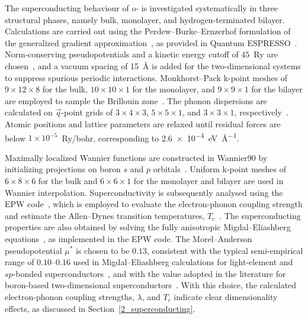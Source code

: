 The superconducting behaviour of o- is investigated systematically in three structural phases,
namely bulk, monolayer, and hydrogen-terminated bilayer.
Calculations are carried out using the Perdew--Burke--Ernzerhof formulation of the generalized gradient approximation~\cite{perdew1996generalized},
as provided in Quantum ESPRESSO~\cite{giannozzi2009quantum}.
Norm-conserving pseudopotentials and a kinetic energy cutoff of $45$~Ry are chosen~\cite{hamann2013optimized},
and a vacuum spacing of \qty{15}{\angstrom} is added for the two-dimensional systems to suppress spurious periodic interactions.
Monkhorst--Pack k-point meshes of $9 \times 12 \times 8$ for the bulk,
$10 \times 10 \times 1$ for the monolayer,
and $9 \times 9 \times 1$ for the bilayer are employed to sample the Brillouin zone~\cite{methfessel1989high}.
The phonon dispersions are calculated on $\vec{q}$-point grids of $3 \times 4 \times 3$,
$5 \times 5 \times 1$, and $3 \times 3 \times 1$, respectively~\cite{baroni2001phonons}.
Atomic positions and lattice parameters are relaxed until residual forces are below $1\times10^{-5}$~Ry/bohr,
corresponding to \qty{2.6e-4}{\electronvolt\per\angstrom}.

Maximally localized Wannier functions are constructed in Wannier90 by initializing projections on boron $s$ and $p$ orbitals~\cite{pizzi2020wannier90}.
Uniform k-point meshes of $6 \times 8 \times 6$ for the bulk and $6 \times 6 \times 1$ for the monolayer and bilayer are used in Wannier interpolation.
Superconductivity is subsequently analysed using the EPW code~\cite{giannozzi2009quantum,giannozzi2020quantum,giannozzi2017advanced,ponce2016epw},
which is employed to evaluate the electron-phonon coupling strength and estimate the Allen--Dynes transition temperatures, $T_c$~\cite{margine2013anisotropic}.
The superconducting properties are also obtained by solving the fully anisotropic Migdal--Eliashberg equations~\cite{bardeen1955electron,giustino2017electron,margine2013anisotropic},
as implemented in the EPW code.
The Morel--Anderson pseudopotential $\mu^{*}$ is chosen to be $0.13$,
consistent with the typical semi-empirical range of $0.10$--$0.16$ used in Migdal--Eliashberg calculations for light-element and $sp$-bonded superconductors~\cite{allen-dynes},
and with the value adopted in the literature for boron-based two-dimensional superconductors~\cite{zhao2019two}.
With this choice,
the calculated electron-phonon coupling strengths, $\lambda$, and $T_c$ indicate clear dimensionality effects,
as discussed in Section~\ref{2_superconducting}.

